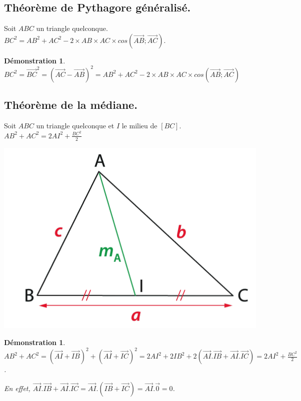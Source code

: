 \documentclass[a4paper,11pt]{article}
\theoremstyle{break}
\newcounter{enonce}
\newtheorem{demonstration}[enonce]{Démonstration}
\begin{document}
\newpage

\subsection{Théorème de Pythagore généralisé.}

\begin{theorem}
 Soit $ABC$ un triangle quelconque. $BC^2=AB^2+AC^2-2 \times AB\times AC\times cos(\vec{AB};\vec{AC})$.
 
\end{theorem}

\begin{demonstration}
 $BC^2=\vec{BC}^2=(\vec{AC}-\vec{AB})^2=AB^2+AC^2-2\times AB\times AC \times cos(\vec{AB};\vec{AC})$
\end{demonstration}


\subsection{Théorème de la médiane.}

\begin{theorem}
 Soit $ABC$ un triangle quelconque et $I$ le milieu de $[BC]$. $AB^2+AC^2=2AI^2+\frac{BC^2}{2}$
 
   \begin{center}
    \includegraphics[scale=0.5]{../Images/mediane.png}
  \end{center}
\end{theorem}

\begin{demonstration}
 $AB^2+AC^2=(\vec{AI}+\vec{IB})^2+(\vec{AI}+\vec{IC})^2=
 2AI^2+2IB^2+2(\vec{AI}.\vec{IB}+\vec{AI}.\vec{IC})=
 2AI^2+\frac{BC^2}{2}$. 
 
 En effet, $\vec{AI}.\vec{IB}+\vec{AI}.\vec{IC}=\vec{AI}.(\vec{IB}+\vec{IC})=\vec{AI}.\vec{0}=0$.
\end{demonstration}
\end{document}
